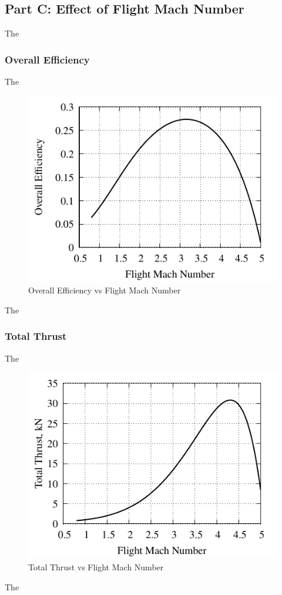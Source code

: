 \documentclass[conf]{new-aiaa} %
\begin{document}
\subsection{Part C: Effect of Flight Mach Number}
The

\subsubsection{Overall Efficiency}
The

\begin{figure}[hbt!] %
    \centering
    \includegraphics[]{media/performance_parameter_files/part_c_eta_o.pdf}
    \caption{\label{fig:partcetao}Overall Efficiency vs Flight Mach Number}
\end{figure}
The

\subsubsection{Total Thrust}
The

\begin{figure}[hbt!] %
    \centering
    \includegraphics[]{media/performance_parameter_files/part_c_T.pdf}
    \caption{\label{fig:partct}Total Thrust vs Flight Mach Number}
\end{figure}
The
\end{document}

